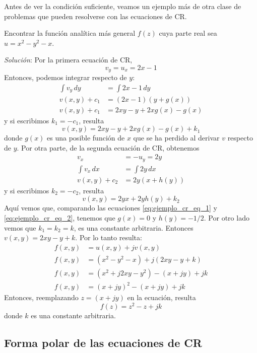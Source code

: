 Antes de ver la condición suficiente, veamos un ejemplo más de otra clase de problemas que pueden resolverse con las ecuaciones de CR.
\begin{example}
  Encontrar la función analítica más general $f(z)$ cuya parte real sea $u=x^2-y^2-x$.

  \textit{Solución}: Por la primera ecuación de CR,
  \[
    v_y = u_x = 2x-1
  \]
  Entonces, podemos integrar respecto de $y$:
  \begin{align*}
    \int v_y \, dy &= \int 2x -1 \, dy \\ 
    v(x,y) + c_1 &= (2x-1)(y+g(x)) \\ 
    v(x,y) + c_1 &= 2xy - y + 2xg(x) - g(x) 
  \end{align*}
  y si escribimos $k_1=-c_1$, resulta
  \begin{equation}\label{eq:ejemplo_cr_eq_1}
    v(x,y) = 2xy - y + 2xg(x) - g(x) + k_1
  \end{equation}
  donde $g(x)$ es una posible función de $x$ que se ha perdido al derivar $v$ respecto de $y$. Por otra parte, de la segunda ecuación de CR, obtenemos
  \begin{align*}
    v_x &= -u_y = 2y \\ 
    \int v_x \,dx &= \int 2y \, dx \\ 
    v(x,y) + c_2 &= 2y (x + h(y)) 
  \end{align*}
  y si escribimos $k_2=-c_2$, resulta
  \begin{equation}\label{eq:ejemplo_cr_eq_2}
    v(x,y) = 2yx + 2yh(y) + k_2
  \end{equation}
  Aquí vemos que, comparando las ecuaciones \ref{eq:ejemplo_cr_eq_1} y \ref{eq:ejemplo_cr_eq_2}, tenemos que $g(x)=0$ y $h(y)=-1/2$. Por otro lado vemos que $k_1 = k_2 = k$, es una constante arbitraria. Entonces $v(x,y)=2xy - y + k$. Por lo tanto resulta:
  \begin{align*}
    f(x,y) &= u(x,y) + jv(x,y) \\ 
    f(x,y) &= (x^2-y^2-x) + j(2xy - y + k) \\ 
    f(x,y) &= (x^2 + j2xy - y^2) - (x+jy) + jk \\ 
    f(x,y) &= (x+jy)^2 - (x+jy) + jk
  \end{align*}
  Entonces, reemplazando $z=(x+jy)$ en la ecuación, resulta
  \[
    \boxed{f(z) = z^2 - z + jk}
  \]
  donde $k$ es una constante arbitraria.
\end{example}

\subsection{Forma polar de las ecuaciones de CR}

